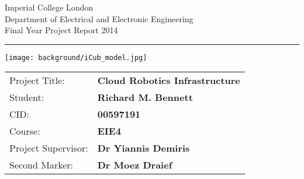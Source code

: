 \begin{titlepage}
                \setlength{\parindent}{0pt}
                \setlength{\parskip}{0pt}

                {
                                \Large
                                \raggedright
                                Imperial College London\\[17pt]
                                Department of Electrical and Electronic Engineering\\[17pt]
                                Final Year Project Report 2014\\[17pt]
 
                }

                \rule{\columnwidth}{3pt}
                \vfill
                \centering
                  \texttt{[image: background/iCub\_model.jpg]}
                \vfill
                \setlength{\tabcolsep}{0pt}

                \begin{tabular}{p{40mm}p{\dimexpr\columnwidth-40mm}}
                                Project Title: & \textbf{Cloud Robotics Infrastructure} \\[12pt]
                                Student: & \textbf{Richard M. Bennett} \\[12pt]
                                CID: & \textbf{00597191} \\[12pt]
                                Course: & \textbf{EIE4} \\[12pt]
                                Project Supervisor: & \textbf{Dr Yiannis Demiris} \\[12pt]
                                Second Marker: & \textbf{Dr Moez Draief} \\
                \end{tabular}
\end{titlepage}